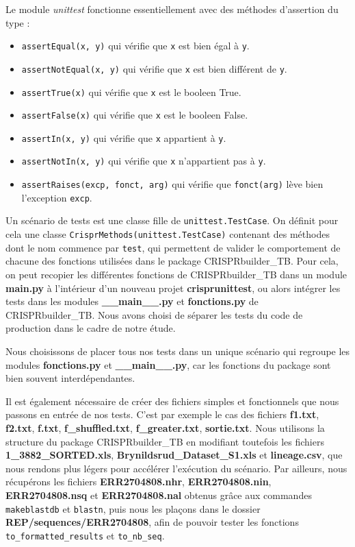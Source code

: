 \documentclass[twoside,a4paper,11pt,frenchb,openany]{report}
\begin{document}
Le module \textit{unittest} fonctionne essentiellement avec des méthodes d'assertion du type :

\begin{itemize}
\item \texttt{assertEqual(x, y)} qui vérifie que \texttt{x} est bien égal à \texttt{y}. 
\item \texttt{assertNotEqual(x, y)} qui vérifie que \texttt{x} est bien différent de \texttt{y}.
\item \texttt{assertTrue(x)} qui vérifie que \texttt{x} est le booleen True.
\item \texttt{assertFalse(x)} qui vérifie que \texttt{x} est le booleen False.
\item \texttt{assertIn(x, y)} qui vérifie que \texttt{x} appartient à \texttt{y}.
\item \texttt{assertNotIn(x, y)} qui vérifie que \texttt{x} n'appartient pas à \texttt{y}.
\item \texttt{assertRaises(excp, fonct, arg)} qui vérifie que \texttt{fonct(arg)} lève bien l'exception \texttt{excp}.
\end{itemize}

Un scénario de tests est une classe fille de \texttt{unittest.TestCase}. On définit pour cela une classe \texttt{CrisprMethods(unittest.TestCase)} contenant des méthodes dont le nom commence par \texttt{test}, qui permettent de valider le comportement de chacune des fonctions utilisées dans le package CRISPRbuilder\_TB. Pour cela, on peut recopier les différentes fonctions de CRISPRbuilder\_TB dans un module \textbf{main.py} à l'intérieur d'un nouveau projet \textbf{crisprunittest}, ou alors intégrer les tests dans les modules \textbf{\_\_main\_\_.py} et \textbf{fonctions.py} de CRISPRbuilder\_TB. Nous avons choisi de séparer les tests du code de production dans le cadre de notre étude. 

Nous choisissons de placer tous nos tests dans un unique scénario qui regroupe les modules  \textbf{fonctions.py} et \textbf{\_\_main\_\_.py}, car les fonctions du package sont bien souvent interdépendantes.

Il est également nécessaire de créer des fichiers simples et fonctionnels que nous passons en entrée de nos tests. C'est par exemple le cas des fichiers \textbf{f1.txt}, \textbf{f2.txt}, \textbf{f.txt}, \textbf{f\_shuffled.txt}, \textbf{f\_greater.txt}, \textbf{sortie.txt}. Nous utilisons la structure du package CRISPRbuilder\_TB en modifiant toutefois les fichiers \textbf{1\_3882\_SORTED.xls}, \textbf{Brynildsrud\_Dataset\_S1.xls} et \textbf{lineage.csv}, que nous rendons plus légers pour accélérer l'exécution du scénario. Par ailleurs, nous récupérons les fichiers \textbf{ERR2704808.nhr}, \textbf{ERR2704808.nin}, \textbf{ERR2704808.nsq} et \textbf{ERR2704808.nal} obtenus grâce aux commandes \texttt{makeblastdb} et \texttt{blastn}, puis nous les plaçons dans le dossier \textbf{REP/sequences/ERR2704808}, afin de pouvoir tester les fonctions \texttt{to\_formatted\_results} et \texttt{to\_nb\_seq}. 
\end{document}
